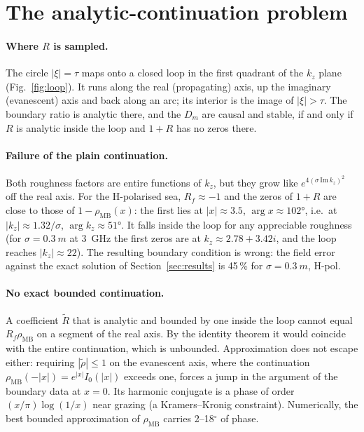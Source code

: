 \documentclass[11pt,a4paper]{article}
\newcommand{\kz}{k_z}
\newcommand{\Rt}{\tilde R}
\newcommand{\rhoMB}{\rho_{\mathrm{MB}}}
\begin{document}
\section{The analytic-continuation problem}\label{sec:continuation}

\paragraph{Where $R$ is sampled.}
The circle $|\xi|=\tau$ maps onto a closed loop in the first quadrant of the
$\kz$ plane (Fig.~\ref{fig:loop}). It runs along the real (propagating) axis, up
the imaginary (evanescent) axis and back along an arc; its interior is the image of
$|\xi|>\tau$. The boundary ratio is analytic there, and the $D_m$ are causal and
stable, if and only if $R$ is analytic inside the loop and $1+R$ has no zeros there.

\paragraph{Failure of the plain continuation.}
Both roughness factors are entire functions of $\kz$, but they grow like
$e^{4(\sigma\,\mathrm{Im}\,\kz)^2}$ off the real axis. For the H-polarised sea,
$R_f\approx-1$ and the zeros of $1+R$ are close to those of $1-\rhoMB(x)$: the first
lies at $|x|\approx3.5$, $\arg x\approx\ang{102}$, i.e.\ at $|\kz|\approx1.32/\sigma$,
$\arg\kz\approx\ang{51}$. It falls inside the loop for any appreciable roughness
(for $\sigma=\SI{0.3}{m}$ at \SI{3}{GHz} the first zeros are at
$\kz\approx2.78+3.42i$, and the loop reaches $|\kz|\approx22$). The resulting
boundary condition is wrong: the field error against the exact solution of
Section~\ref{sec:results} is 45\,\% for $\sigma=\SI{0.3}{m}$, H-pol.

\paragraph{No exact bounded continuation.}
A coefficient $\Rt$ that is analytic and bounded by one inside the loop cannot equal
$R_f\rhoMB$ on a segment of the real axis. By the identity theorem it would coincide
with the entire continuation, which is unbounded. Approximation does not escape
either: requiring $|\tilde\rho|\le1$ on the evanescent axis, where the continuation
$\rhoMB(-|x|)=e^{|x|}I_0(|x|)$ exceeds one, forces a jump in the argument of the
boundary data at $x=0$. Its harmonic conjugate is a phase of order
$(x/\pi)\log(1/x)$ near grazing (a Kramers--Kronig constraint). Numerically, the
best bounded approximation of $\rhoMB$ carries 2--18$^\circ$ of phase.
\end{document}
